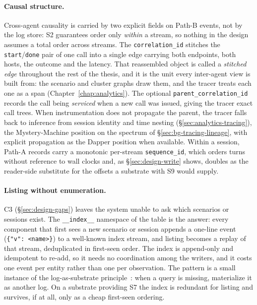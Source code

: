 \paragraph{Causal structure.} Cross-agent causality is carried by two
explicit fields on Path-B events, not by the log store: S2 guarantees order
only \emph{within} a stream, so nothing in the design assumes a total order
across streams. The \texttt{correlation\_id} stitches the
\texttt{start}/\texttt{done} pair of one call into a single edge carrying
both endpoints, both hosts, the outcome and the latency. That reassembled
object is called a \emph{stitched edge} throughout the rest of the thesis,
and it is the unit every inter-agent view is built from: the scenario and
cluster graphs draw them, and the tracer treats each one as a span
(Chapter~\ref{chap:analytics}). The
optional \texttt{parent\_correlation\_id} records the call being
\emph{serviced} when a new call was issued, giving the tracer exact call
trees. When instrumentation does not propagate the parent, the tracer falls
back to inference from session identity and time nesting
(\S\ref{sec:analytics-tracing}), the Mystery-Machine position on the
spectrum of \S\ref{sec:bg-tracing-lineage}, with explicit propagation as the
Dapper position when available. Within a session, Path-A records carry a
monotonic per-stream \texttt{sequence\_id}, which orders turns without
reference to wall clocks and, as \S\ref{sec:design-write} shows, doubles as
the reader-side substitute for the offsets a substrate with S9 would
supply.

\paragraph{Listing without enumeration.} C3 (\S\ref{sec:design-gaps})
leaves the system unable to ask which scenarios or sessions exist. The
\texttt{\_\_index\_\_} namespace of the table is the answer: every component
that first sees a new scenario or session appends a one-line event
(\texttt{\{"v": <name>\}}) to a well-known index stream, and listing becomes a
replay of that stream, deduplicated in first-seen order. The index is
append-only and idempotent to re-add, so it needs no coordination among the
writers, and it costs one event per entity rather than one per observation.
The pattern is a small instance of the log-as-substrate
principle~\cite{kreps2013log}: when a query is missing, materialize it as
another log. On a substrate providing S7 the index is redundant for listing
and survives, if at all, only as a cheap first-seen ordering.

